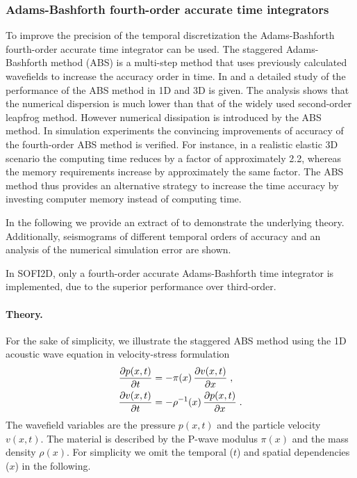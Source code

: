 \subsubsection{Adams-Bashforth fourth-order accurate time integrators}
\label{adams-bashforth}
To improve the precision of the temporal discretization the Adams-Bashforth fourth-order accurate time integrator can be used. 
The staggered Adams-Bashforth method (ABS) is a multi-step method that uses previously calculated wavefields to increase the accuracy order in time. In \citet{bohlen2015higher2} and \citet{bohlen2015higher} a detailed study of the performance of the ABS method in 1D and 3D is given. The analysis shows that the numerical dispersion is much lower than that of the widely used second-order leapfrog method. However numerical dissipation is introduced by the ABS method. In simulation experiments the convincing improvements of accuracy of the fourth-order ABS method is verified. For instance, in a realistic elastic 3D scenario the computing time reduces by a factor of approximately 2.2, whereas the memory requirements increase by approximately the same factor. The ABS method thus provides an alternative strategy to increase the time accuracy by investing computer memory instead of computing time.

In the following we provide an extract of \citet{bohlen2015higher2} to demonstrate the underlying theory. Additionally, seismograms of different temporal orders of accuracy and an analysis of the numerical simulation error are shown.

In SOFI2D, only a fourth-order accurate Adams-Bashforth time integrator is implemented, due to the superior performance over third-order.

\paragraph{Theory.}
For the sake of simplicity, we illustrate the staggered ABS method using the 1D acoustic wave equation in velocity-stress formulation
\begin{subequations}
    \begin{align}
        \frac{\partial p(x,t)}{\partial t} &= - \pi (x)\,\frac{\partial v(x,t)}{\partial x}  \notag\;,\\
        \frac{\partial v(x,t)}{\partial t} &= -\rho^{-1}(x)\,\frac{\partial p(x,t)}{\partial x}\;.
        \label{waveequation}
    \end{align}
\end{subequations}
The wavefield variables are the pressure $p(x,t)$ and the particle velocity $v(x,t)$. The material is described by the P-wave modulus $\pi (x)$ and the mass density $\rho(x)$. For simplicity we omit the temporal ($t$) and spatial dependencies ($x$)  in the following.


